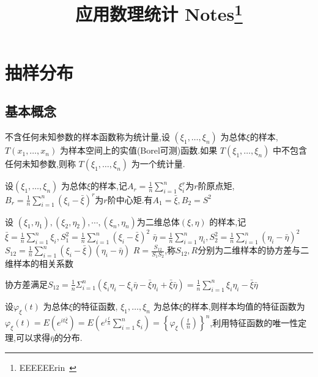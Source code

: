 \documentclass[10pt]{yerbaformat}
\title{应用数理统计 Notes\footnote{EEEEEErin~}}
\date{}
\begin{document}
\author{}
\maketitle
\footnotesize
\tableofcontents
\section{抽样分布}
\subsection{基本概念}

\begin{definition}[统计量]
    不含任何未知参数的样本函数称为统计量,设 $\left(\xi_{1}, \ldots, \xi_{n}\right)$ 为总体$\xi$的样本,$T\left(x_{1}, \ldots, x_{n}\right)$ 为样本空间上的实值(Borel可测)函数.如果 $T\left(\xi_{1}, \ldots, \xi_{n}\right)$ 中不包含任何未知参数,则称 $T\left(\xi_{1}, \ldots, \xi_{n}\right)$ 为一个统计量.
\end{definition}

\begin{definition}[矩]
    设$\left(\xi_{1}, \ldots, \xi_{n}\right)$ 为总体$\xi$的样本,记$A_{r}=\frac{1}{n} \sum_{i=1}^{n} \xi_{i}^{r}$为$r$阶原点矩,$ B_{r}=\frac{1}{n} \sum_{i=1}^{n}\left(\xi_{i}-\bar{\xi}\right)^{r}$为$r$阶中心矩.有$A_{1}=\bar{\xi}, B_{2}=S^{2}$
\end{definition}

\begin{definition}[相关系数]
    设 $\left(\xi_{1}, \eta_{1}\right),\left(\xi_{2}, \eta_{2}\right), \cdots,\left(\xi_{n}, \eta_{n}\right)$为二维总体$(\xi, \eta)$ 的样本,记$\bar{\xi}=\frac{1}{n} \sum_{i=1}^{n} \xi_{i}, S_{1}^{2}=\frac{1}{n} \sum_{i=1}^{n}\left(\xi_{i}-\bar{\xi}\right)^{2}$
    $\bar{\eta}=\frac{1}{n} \sum_{i=1}^{n} \eta_{i}, S_{2}^{2}=\frac{1}{n} \sum_{i=1}^{n}\left(\eta_{i}-\bar{\eta}\right)^{2}$
    $S_{12}=\frac{1}{n} \sum_{i=1}^{n}\left(\xi_{i}-\bar{\xi}\right)\left(\eta_{i}-\bar{\eta}\right)$
    $R=\frac{S_{12}}{S_{1} S_{2}}$,称$S_{12}, R$分别为二维样本的协方差与二维样本的相关系数
\end{definition}

\par 协方差满足$S_{12}=\frac{1}{n} \Sigma_{i=1}^{n}\left(\xi_{i} \eta_{i}-\xi_{i} \bar{\eta}-\bar{\xi} \eta_{i}+\bar{\xi} \bar{\eta}\right)=\frac{1}{n} \sum_{i=1}^{n} \xi_{i} \eta_{i}-\bar{\xi} \bar{\eta}$

\begin{definition}[特征函数]
    设$\varphi_{\xi}(t)$ 为总体$\xi$的特征函数, $\xi_{1}, \ldots, \xi_{n}$ 为总体$\xi$的样本,则样本均值的特征函数为$\varphi_{\xi}(t)=E\left(e^{i t \bar{\xi}}\right)=E\left(e^{i \frac{t}{n}} \sum_{i=1}^{n} \xi_{i}\right)=\left\{\varphi_{\xi}\left(\frac{t}{n}\right)\right\}^{n}$,利用特征函数的唯一性定理,可以求得$\bar{\eta}$的分布.
\end{definition}
\end{document}
